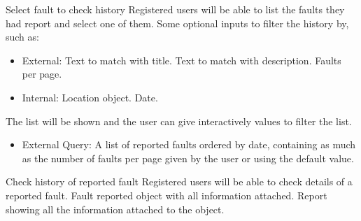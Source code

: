 \begin{requirement}{Select fault to check history}
\reqdesc Registered users will be able to list the faults they had report and select one of them.
\reqin Some optional inputs to filter the history by, such as:
\begin{itemize}
	\item External:
	\subitem Text to match with title.
	\subitem Text to match with description.
	\subitem Faults per page.
	\item Internal:
	\subitem Location object.
	\subitem Date.
\end{itemize}
\reqsteps The list will be shown and the user can give interactively values to filter the list.
\reqout 
\begin{itemize}
	\item External Query:
	\subitem A list of reported faults ordered by date, containing as much as the number of faults per page given by the user or using the default value.
\end{itemize}
\end{requirement}

\begin{requirement}{Check history of reported fault}
\reqdesc Registered users will be able to check details of a reported fault.
\reqin Fault reported object with all information attached.
\reqout Report showing all the information attached to the object.
\end{requirement}
